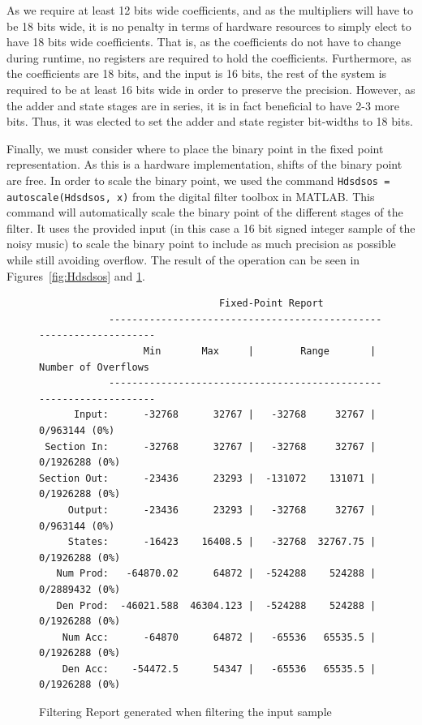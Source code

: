 \documentclass[]{article}
\begin{document}
As we require at least 12 bits wide coefficients, and as the multipliers will have to be 18 bits wide, it is no penalty in terms of hardware resources to simply elect to have 18 bits wide coefficients. That is, as the coefficients do not have to change during runtime, no registers are required to hold the coefficients.
Furthermore, as the coefficients are 18 bits, and the input is 16 bits, the rest of the system is required to be at least 16 bits wide in order to preserve the precision. However, as the adder and state stages are in series, it is in fact beneficial to have 2-3 more bits. Thus, it was elected to set the adder and state register bit-widths to 18 bits.

Finally, we must consider where to place the binary point in the fixed point representation. As this is a hardware implementation, shifts of the binary point are free. In order to scale the binary point, we used the command \verb"Hdsdsos = autoscale(Hdsdsos, x)" from the digital filter toolbox in MATLAB.
This command will automatically scale the binary point of the different stages of the filter. It uses the provided input (in this case a 16 bit signed integer sample of the noisy music) to scale the binary point to include as much precision as possible while still avoiding overflow. The result of the operation can be seen in Figures~\ref{fig:Hdsdsos} and \ref{fig:fixedpoint_report}.

\begin{figure}[htbp]
	\begin{center}
		\begin{lstlisting}
                               Fixed-Point Report                                          
            -------------------------------------------------------------------
                  Min       Max     |        Range       | Number of Overflows
            -------------------------------------------------------------------
      Input:      -32768      32767 |   -32768     32767 |   0/963144 (0%)
 Section In:      -32768      32767 |   -32768     32767 |  0/1926288 (0%)
Section Out:      -23436      23293 |  -131072    131071 |  0/1926288 (0%)
     Output:      -23436      23293 |   -32768     32767 |   0/963144 (0%)
     States:      -16423    16408.5 |   -32768  32767.75 |  0/1926288 (0%)
   Num Prod:   -64870.02      64872 |  -524288    524288 |  0/2889432 (0%)
   Den Prod:  -46021.588  46304.123 |  -524288    524288 |  0/1926288 (0%)
    Num Acc:      -64870      64872 |   -65536   65535.5 |  0/1926288 (0%)
    Den Acc:    -54472.5      54347 |   -65536   65535.5 |  0/1926288 (0%)
		\end{lstlisting}
	\end{center}
	\caption{Filtering Report generated when filtering the input sample}
	\label{fig:fixedpoint_report}
\end{figure}
\end{document}
